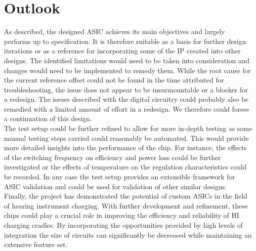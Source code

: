 \section{Outlook}
\label{chap:outlook}
As described, the designed \ac{ASIC} achieves its main objectives and largely performs up to specification. It is therefore suitable as a basis for further design iterations or as a reference for incorporating some of the IP created into other designs. The identified limitations would need to be taken into consideration and changes would need to be implemented to remedy them. While the root cause for the current reference offset could not be found in the time attributed for troubleshooting, the issue does not appear to be insurmountable or a blocker for a redesign. The issues described with the digital circuitry could probably also be remedied with a limited amount of effort in a redesign. We therefore could forsee a continuation of this design.\\
The test setup could be further refined to allow for more in-depth testing as some manual testing steps carried could reasonably be automated. This would provide more detailed insights into the performance of the chip. For instance, the effects of the switching frequency on efficiency and power loss could be further investigated or the effects of temperature on the regulation characteristics could be recorded. In any case the test setup provides an extensible framework for \ac{ASIC} validation and could be used for validation of other similar designs. \\
Finally, the project has demonstrated the potential of custom \ac{ASIC}s in the field of hearing instrument charging. With further development and refinement, these chips could play a crucial role in improving the efficiency and reliability of \ac{HI} charging cradles. By incorporating the opportunities provided by high levels of integration the size of circuits can significantly be decreased while maintaining an extensive feature set. 
\clearpage
